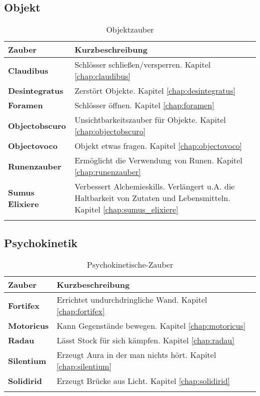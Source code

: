 \subsection{Objekt}
\begin{longtable}{|p{5cm}|p{10cm}|}
\hline
\textbf{Zauber} & \textbf{Kurzbeschreibung} \\ \hline

\textbf{Claudibus} & Schlösser schließen/versperren. Kapitel \ref{chap:claudibus} \\ \hline

\textbf{Desintegratus} & Zerstört Objekte. Kapitel \ref{chap:desintegratus} \\ \hline

\textbf{Foramen} & Schlösser öffnen. Kapitel \ref{chap:foramen} \\ \hline

\textbf{Objectobscuro} & Unsichtbarkeitszauber für Objekte. Kapitel \ref{chap:objectobscuro} \\ \hline

\textbf{Objectovoco} & Objekt etwas fragen. Kapitel \ref{chap:objectovoco} \\ \hline

\textbf{Runenzauber} & Ermöglicht die Verwendung von Runen. Kapitel \ref{chap:runenzauber} \\ \hline

\textbf{Sumus Elixiere} & Verbessert Alchemieskills. Verlängert u.A. die Haltbarkeit von Zutaten und Lebensmitteln. Kapitel \ref{chap:sumus_elixiere} \\ \hline

\caption{Objektzauber}
\label{tab:objektzauber}
\end{longtable}


\subsection{Psychokinetik}
\begin{longtable}{|p{5cm}|p{10cm}|}
\hline
\textbf{Zauber} & \textbf{Kurzbeschreibung} \\ \hline

\textbf{Fortifex} & Errichtet undurchdringliche Wand. Kapitel \ref{chap:fortifex} \\ \hline

\textbf{Motoricus} & Kann Gegenstände bewegen. Kapitel \ref{chap:motoricus} \\ \hline

\textbf{Radau} & Lässt Stock für sich kämpfen. Kapitel \ref{chap:radau} \\ \hline

\textbf{Silentium} & Erzeugt Aura in der man nichts hört. Kapitel \ref{chap:silentium} \\ \hline

\textbf{Solidirid} & Erzeugt Brücke aus Licht. Kapitel \ref{chap:solidirid} \\ \hline

\caption{Psychokinetische-Zauber}
\label{tab:psychokinetische-zauber}
\end{longtable}


